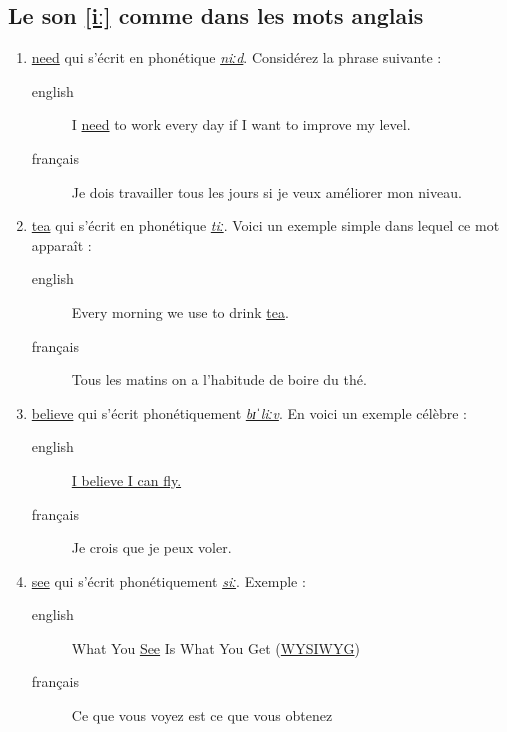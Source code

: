 \documentclass[12pt,a4paper]{book}
\begin{document}
\subsection{Le son \href{https://youtu.be/EuZa9-QbhG8}{[iː]} comme dans les mots anglais}
\label{sec:org62768e9}
\begin{enumerate}
\item \href{http://www.wordreference.com/enfr/need}{need} qui s'écrit en phonétique \href{https://en.oxforddictionaries.com/definition/need}{\emph{niːd}}. Considérez la
phrase suivante :
\begin{description}
\item[{english}] \textenglish{I \href{https://youtu.be/p0quLJutRC8}{need} to work every day if I want to improve my level.}
\item[{français}] Je dois travailler tous les jours si je veux
améliorer mon niveau.
\end{description}
\item \href{http://www.wordreference.com/enfr/tea}{tea} qui s'écrit en phonétique \href{https://en.oxforddictionaries.com/definition/tea}{\emph{tiː}}. Voici un exemple simple dans
lequel ce mot apparaît :
\begin{description}
\item[{english}] \textenglish{Every morning we use to drink \href{https://youtu.be/Euh8dY4EU9o}{tea}.}
\item[{français}] Tous les matins on a l'habitude de boire du thé.
\end{description}
\item \href{http://www.wordreference.com/enfr/believe}{believe} qui s'écrit phonétiquement \href{https://en.oxforddictionaries.com/definition/believe}{\emph{bɪˈliːv}}. En voici un exemple
célèbre :
\begin{description}
\item[{english}] \href{https://youtu.be/GIQn8pab8Vc}{\textenglish{I believe I can fly.}}
\item[{français}] Je crois que je peux voler.
\end{description}
\item \href{http://www.wordreference.com/enfr/see}{see} qui s'écrit phonétiquement \href{https://en.oxforddictionaries.com/definition/see}{\emph{siː}}. Exemple :
\begin{description}
\item[{english}] \textenglish{What You \href{https://youtu.be/Dpf2yHjBVYM}{See} Is What You Get (\href{https://fr.wikipedia.org/wiki/What\_you\_see\_is\_what\_you\_get}{WYSIWYG})}
\item[{français}] Ce que vous voyez est ce que vous obtenez
\end{description}
\end{enumerate}
\end{document}
